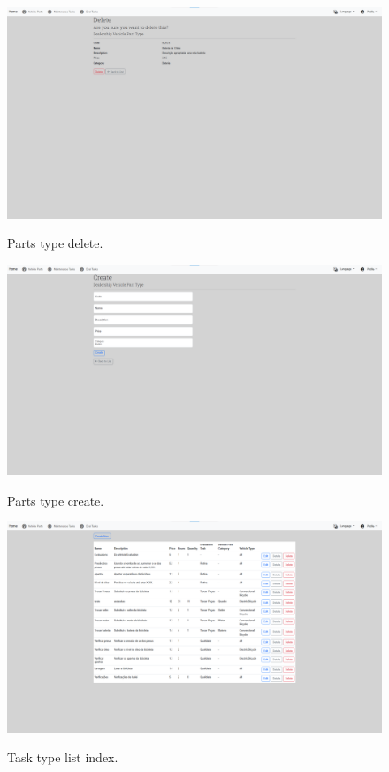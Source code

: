 \begin{figure}[htbp]
  \caption{Parts type delete.}
  \centering
  \includegraphics[width=\textwidth]{figs/Implementation/dealershipAdmin/partsDelete}
  \label{fig:partsDelete}
\end{figure}


\begin{figure}[htbp]
  \caption{Parts type create.}
  \centering
  \includegraphics[width=\textwidth]{figs/Implementation/dealershipAdmin/partsCreate}
  \label{fig:partsCreate}
\end{figure}



\begin{figure}[htbp]
  \caption{Task type list index.}
  \centering
  \includegraphics[width=\textwidth]{figs/Implementation/dealershipAdmin/taskIndex}
  \label{fig:taskIndex}
\end{figure}

